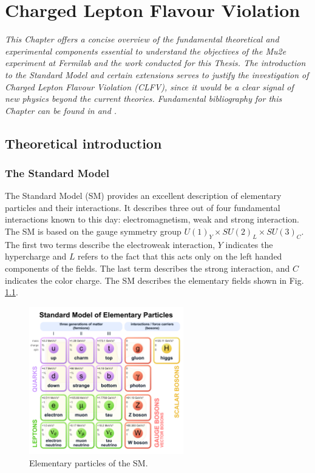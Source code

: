 \chapter{Charged Lepton Flavour Violation}\label{intr}
\textit{This Chapter offers a concise overview of the fundamental 
theoretical and experimental components essential to understand the objectives 
of the Mu2e experiment at Fermilab and the work conducted for this 
Thesis. The introduction to the Standard Model and certain extensions serves to 
justify the investigation of Charged Lepton Flavour Violation (CLFV), 
since it would be a clear signal of new physics beyond the current theories. 
Fundamental bibliography for this Chapter can be found in \cite{Bernstein_2013} and \cite{clfv_signorelli}.}
\section{Theoretical introduction}
\subsection{The Standard Model}
The Standard Model (SM) provides an excellent description of elementary particles and their interactions.
It describes three out of 
four fundamental interactions known to this day: electromagnetism,
weak and strong interaction.
The SM is 
based on the gauge symmetry group $U(1)_Y \times SU(2)_L \times SU(3)_C$. The 
first two terms describe the electroweak interaction, $Y$ indicates 
the hypercharge and $L$ refers to the fact that this acts only on the left handed components of the fields.
The last term describes the strong interaction, and $C$ indicates the color charge.
The SM describes the elementary fields shown in Fig. \ref{fig:sm}.

\begin{figure}[!h]
\centering
\includegraphics[width =0.6\textwidth]{figures/pdf/Standard_Model_of_Elementary_Particles.pdf}
\caption[Elementary particles of the Standard Model.]{Elementary particles of the SM.}
\label{fig:sm}
\end{figure}


